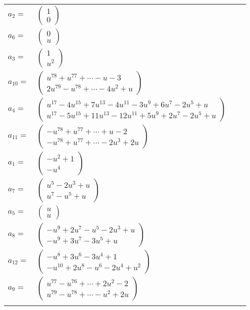 \documentclass[1p]{elsarticle_modified}
\theoremstyle{definition}
\begin{document}
\begin{tabular}{m{7pt} m{180pt} m{7pt} m{180pt} }
\flushright $a_{2}=$&$\begin{pmatrix}1\\0\end{pmatrix}$ \\
\flushright $a_{6}=$&$\begin{pmatrix}0\\u\end{pmatrix}$ \\
\flushright $a_{3}=$&$\begin{pmatrix}1\\u^2\end{pmatrix}$ \\
\flushright $a_{10}=$&$\begin{pmatrix}u^{78}+u^{77}+\cdots- u-3\\2 u^{79}- u^{78}+\cdots-4 u^2+u\end{pmatrix}$ \\
\flushright $a_{4}=$&$\begin{pmatrix}u^{17}-4 u^{15}+7 u^{13}-4 u^{11}-3 u^9+6 u^7-2 u^5+u\\u^{17}-5 u^{15}+11 u^{13}-12 u^{11}+5 u^9+2 u^7-2 u^5+u\end{pmatrix}$ \\
\flushright $a_{11}=$&$\begin{pmatrix}- u^{78}+u^{77}+\cdots+u-2\\- u^{78}+u^{77}+\cdots-2 u^3+2 u\end{pmatrix}$ \\
\flushright $a_{1}=$&$\begin{pmatrix}- u^2+1\\- u^4\end{pmatrix}$ \\
\flushright $a_{7}=$&$\begin{pmatrix}u^5-2 u^3+u\\u^7- u^5+u\end{pmatrix}$ \\
\flushright $a_{5}=$&$\begin{pmatrix}u\\u\end{pmatrix}$ \\
\flushright $a_{8}=$&$\begin{pmatrix}- u^9+2 u^7- u^5-2 u^3+u\\- u^9+3 u^7-3 u^5+u\end{pmatrix}$ \\
\flushright $a_{12}=$&$\begin{pmatrix}- u^8+3 u^6-3 u^4+1\\- u^{10}+2 u^8- u^6-2 u^4+u^2\end{pmatrix}$ \\
\flushright $a_{9}=$&$\begin{pmatrix}u^{77}- u^{76}+\cdots+2 u^2-2\\u^{79}- u^{78}+\cdots- u^2+2 u\end{pmatrix}$\\&\end{tabular}
\end{document}
